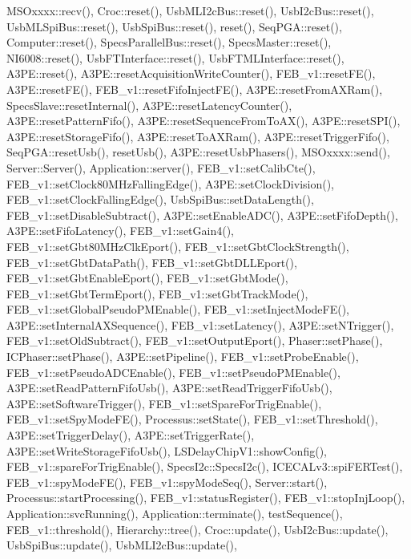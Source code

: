 M\+S\+Oxxxx\+::recv(), Croc\+::reset(), Usb\+M\+L\+I2c\+Bus\+::reset(), Usb\+I2c\+Bus\+::reset(), Usb\+M\+L\+Spi\+Bus\+::reset(), Usb\+Spi\+Bus\+::reset(), reset(), Seq\+P\+G\+A\+::reset(), Computer\+::reset(), Specs\+Parallel\+Bus\+::reset(), Specs\+Master\+::reset(), N\+I6008\+::reset(), Usb\+F\+T\+Interface\+::reset(), Usb\+F\+T\+M\+L\+Interface\+::reset(), A3\+P\+E\+::reset(), A3\+P\+E\+::reset\+Acquisition\+Write\+Counter(), F\+E\+B\+\_\+v1\+::reset\+F\+E(), A3\+P\+E\+::reset\+F\+E(), F\+E\+B\+\_\+v1\+::reset\+Fifo\+Inject\+F\+E(), A3\+P\+E\+::reset\+From\+A\+X\+Ram(), Specs\+Slave\+::reset\+Internal(), A3\+P\+E\+::reset\+Latency\+Counter(), A3\+P\+E\+::reset\+Pattern\+Fifo(), A3\+P\+E\+::reset\+Sequence\+From\+To\+A\+X(), A3\+P\+E\+::reset\+S\+P\+I(), A3\+P\+E\+::reset\+Storage\+Fifo(), A3\+P\+E\+::reset\+To\+A\+X\+Ram(), A3\+P\+E\+::reset\+Trigger\+Fifo(), Seq\+P\+G\+A\+::reset\+Usb(), reset\+Usb(), A3\+P\+E\+::reset\+Usb\+Phasers(), M\+S\+Oxxxx\+::send(), Server\+::\+Server(), Application\+::server(), F\+E\+B\+\_\+v1\+::set\+Calib\+Cte(), F\+E\+B\+\_\+v1\+::set\+Clock80\+M\+Hz\+Falling\+Edge(), A3\+P\+E\+::set\+Clock\+Division(), F\+E\+B\+\_\+v1\+::set\+Clock\+Falling\+Edge(), Usb\+Spi\+Bus\+::set\+Data\+Length(), F\+E\+B\+\_\+v1\+::set\+Disable\+Subtract(), A3\+P\+E\+::set\+Enable\+A\+D\+C(), A3\+P\+E\+::set\+Fifo\+Depth(), A3\+P\+E\+::set\+Fifo\+Latency(), F\+E\+B\+\_\+v1\+::set\+Gain4(), F\+E\+B\+\_\+v1\+::set\+Gbt80\+M\+Hz\+Clk\+Eport(), F\+E\+B\+\_\+v1\+::set\+Gbt\+Clock\+Strength(), F\+E\+B\+\_\+v1\+::set\+Gbt\+Data\+Path(), F\+E\+B\+\_\+v1\+::set\+Gbt\+D\+L\+L\+Eport(), F\+E\+B\+\_\+v1\+::set\+Gbt\+Enable\+Eport(), F\+E\+B\+\_\+v1\+::set\+Gbt\+Mode(), F\+E\+B\+\_\+v1\+::set\+Gbt\+Term\+Eport(), F\+E\+B\+\_\+v1\+::set\+Gbt\+Track\+Mode(), F\+E\+B\+\_\+v1\+::set\+Global\+Pseudo\+P\+M\+Enable(), F\+E\+B\+\_\+v1\+::set\+Inject\+Mode\+F\+E(), A3\+P\+E\+::set\+Internal\+A\+X\+Sequence(), F\+E\+B\+\_\+v1\+::set\+Latency(), A3\+P\+E\+::set\+N\+Trigger(), F\+E\+B\+\_\+v1\+::set\+Old\+Subtract(), F\+E\+B\+\_\+v1\+::set\+Output\+Eport(), Phaser\+::set\+Phase(), I\+C\+Phaser\+::set\+Phase(), A3\+P\+E\+::set\+Pipeline(), F\+E\+B\+\_\+v1\+::set\+Probe\+Enable(), F\+E\+B\+\_\+v1\+::set\+Pseudo\+A\+D\+C\+Enable(), F\+E\+B\+\_\+v1\+::set\+Pseudo\+P\+M\+Enable(), A3\+P\+E\+::set\+Read\+Pattern\+Fifo\+Usb(), A3\+P\+E\+::set\+Read\+Trigger\+Fifo\+Usb(), A3\+P\+E\+::set\+Software\+Trigger(), F\+E\+B\+\_\+v1\+::set\+Spare\+For\+Trig\+Enable(), F\+E\+B\+\_\+v1\+::set\+Spy\+Mode\+F\+E(), Processus\+::set\+State(), F\+E\+B\+\_\+v1\+::set\+Threshold(), A3\+P\+E\+::set\+Trigger\+Delay(), A3\+P\+E\+::set\+Trigger\+Rate(), A3\+P\+E\+::set\+Write\+Storage\+Fifo\+Usb(), L\+S\+Delay\+Chip\+V1\+::show\+Config(), F\+E\+B\+\_\+v1\+::spare\+For\+Trig\+Enable(), Specs\+I2c\+::\+Specs\+I2c(), I\+C\+E\+C\+A\+Lv3\+::spi\+F\+E\+R\+Test(), F\+E\+B\+\_\+v1\+::spy\+Mode\+F\+E(), F\+E\+B\+\_\+v1\+::spy\+Mode\+Seq(), Server\+::start(), Processus\+::start\+Processing(), F\+E\+B\+\_\+v1\+::status\+Register(), F\+E\+B\+\_\+v1\+::stop\+Inj\+Loop(), Application\+::svc\+Running(), Application\+::terminate(), test\+Sequence(), F\+E\+B\+\_\+v1\+::threshold(), Hierarchy\+::tree(), Croc\+::update(), Usb\+I2c\+Bus\+::update(), Usb\+Spi\+Bus\+::update(), Usb\+M\+L\+I2c\+Bus\+::update(), 